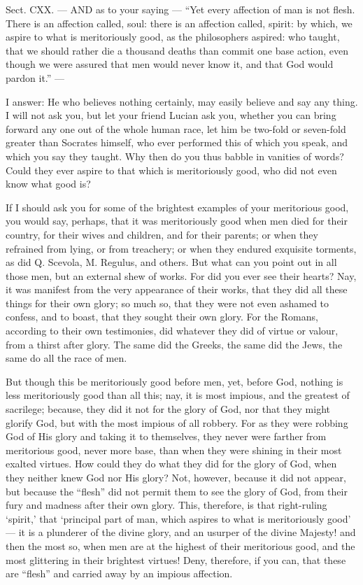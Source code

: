
Sect. CXX. — AND as to your saying — “Yet every affection of man is not flesh. There is an affection called, soul: there is an affection called, spirit: by which, we aspire to what is meritoriously good, as the philosophers aspired: who taught, that we should rather die a thousand deaths than commit one base action, even though we were assured that men would never know it, and that God would pardon it.” —

I answer: He who believes nothing certainly, may easily believe and say any thing. I will not ask you, but let your friend Lucian ask you, whether you can bring forward any one out of the whole human race, let him be two-fold or seven-fold greater than Socrates himself, who ever performed this of which you speak, and which you say they taught. Why then do you thus babble in vanities of words? Could they ever aspire to that which is meritoriously good, who did not even know what good is?

If I should ask you for some of the brightest examples of your meritorious good, you would say, perhaps, that it was meritoriously good when men died for their country, for their wives and children, and for their parents; or when they refrained from lying, or from treachery; or when they endured exquisite torments, as did Q. Scevola, M. Regulus, and others. But what can you point out in all those men, but an external shew of works. For did you ever see their hearts? Nay, it was manifest from the very appearance of their works, that they did all these things for their own glory; so much so, that they were not even ashamed to confess, and to boast, that they sought their own glory. For the Romans, according to their own testimonies, did whatever they did of virtue or valour, from a thirst after glory. The same did the Greeks, the same did the Jews, the same do all the race of men.

But though this be meritoriously good before men, yet, before God, nothing is less meritoriously good than all this; nay, it is most impious, and the greatest of sacrilege; because, they did it not for the glory of God, nor that they might glorify God, but with the most impious of all robbery. For as they were robbing God of His glory and taking it to themselves, they never were farther from meritorious good, never more base, than when they were shining in their most exalted virtues. How could they do what they did for the glory of God, when they neither knew God nor His glory? Not, however, because it did not appear, but because the “flesh” did not permit them to see the glory of God, from their fury and madness after their own glory. This, therefore, is that right-ruling ‘spirit,’ that ‘principal part of man, which aspires to what is meritoriously good’ — it is a plunderer of the divine glory, and an usurper of the divine Majesty! and then the most so, when men are at the highest of their meritorious good, and the most glittering in their brightest virtues! Deny, therefore, if you can, that these are “flesh” and carried away by an impious affection.

